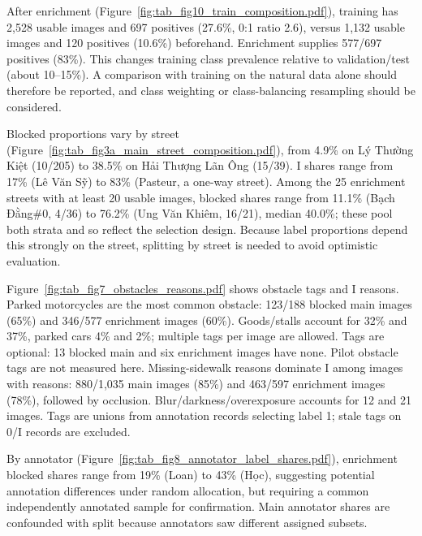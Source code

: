 After enrichment (Figure~\ref{fig:tab_fig10_train_composition.pdf}), training has 2,528 usable images and 697 positives (27.6\%, 0:1 ratio 2.6), versus 1,132 usable images and 120 positives (10.6\%) beforehand. Enrichment supplies 577/697 positives (83\%). This changes training class prevalence relative to validation/test (about 10--15\%). A comparison with training on the natural data alone should therefore be reported, and class weighting or class-balancing resampling should be considered.

Blocked proportions vary by street (Figure~\ref{fig:tab_fig3a_main_street_composition.pdf}), from 4.9\% on Lý Thường Kiệt (10/205) to 38.5\% on Hải Thượng Lãn Ông (15/39). I shares range from 17\% (Lê Văn Sỹ) to 83\% (Pasteur, a one-way street). Among the 25 enrichment streets with at least 20 usable images, blocked shares range from 11.1\% (Bạch Đằng\#0, 4/36) to 76.2\% (Ung Văn Khiêm, 16/21), median 40.0\%; these pool both strata and so reflect the selection design. Because label proportions depend this strongly on the street, splitting by street is needed to avoid optimistic evaluation.

Figure~\ref{fig:tab_fig7_obstacles_reasons.pdf} shows obstacle tags and I reasons. Parked motorcycles are the most common obstacle: 123/188 blocked main images (65\%) and 346/577 enrichment images (60\%). Goods/stalls account for 32\% and 37\%, parked cars 4\% and 2\%; multiple tags per image are allowed. Tags are optional: 13 blocked main and six enrichment images have none. Pilot obstacle tags are not measured here. Missing-sidewalk reasons dominate I among images with reasons: 880/1,035 main images (85\%) and 463/597 enrichment images (78\%), followed by occlusion. Blur/darkness/overexposure accounts for 12 and 21 images. Tags are unions from annotation records selecting label 1; stale tags on 0/I records are excluded.

By annotator (Figure~\ref{fig:tab_fig8_annotator_label_shares.pdf}), enrichment blocked shares range from 19\% (Loan) to 43\% (Học), suggesting potential annotation differences under random allocation, but requiring a common independently annotated sample for confirmation. Main annotator shares are confounded with split because annotators saw different assigned subsets.

